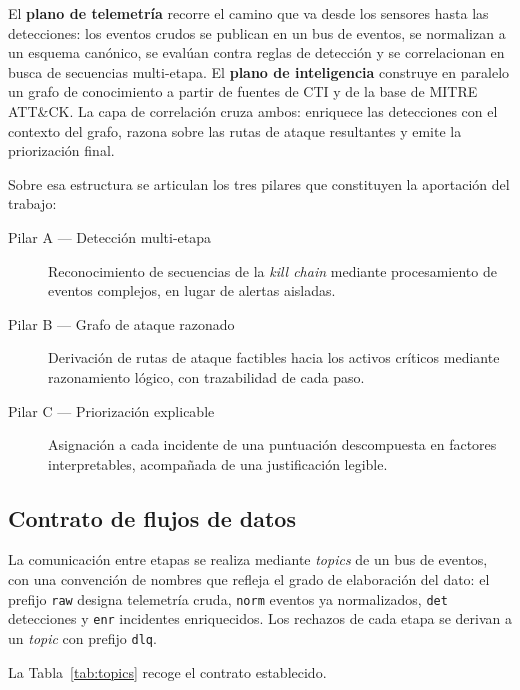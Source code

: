 El \textbf{plano de telemetría} recorre el camino que va desde los sensores hasta las
detecciones: los eventos crudos se publican en un bus de eventos, se normalizan a un esquema
canónico, se evalúan contra reglas de detección y se correlacionan en busca de secuencias
multi-etapa. El \textbf{plano de inteligencia} construye en paralelo un grafo de conocimiento
a partir de fuentes de CTI y de la base de MITRE ATT\&CK. La capa de correlación cruza ambos:
enriquece las detecciones con el contexto del grafo, razona sobre las rutas de ataque
resultantes y emite la priorización final.

Sobre esa estructura se articulan los tres pilares que constituyen la aportación del trabajo:

\begin{description}
    \item[Pilar A --- Detección multi-etapa] Reconocimiento de secuencias de la
    \textit{kill chain} mediante procesamiento de eventos complejos, en lugar de alertas
    aisladas.
    \item[Pilar B --- Grafo de ataque razonado] Derivación de rutas de ataque factibles hacia
    los activos críticos mediante razonamiento lógico, con trazabilidad de cada paso.
    \item[Pilar C --- Priorización explicable] Asignación a cada incidente de una puntuación
    descompuesta en factores interpretables, acompañada de una justificación legible.
\end{description}


\subsection{Contrato de flujos de datos}

La comunicación entre etapas se realiza mediante \textit{topics} de un bus de eventos, con
una convención de nombres que refleja el grado de elaboración del dato: el prefijo
\texttt{raw} designa telemetría cruda, \texttt{norm} eventos ya normalizados, \texttt{det}
detecciones y \texttt{enr} incidentes enriquecidos. Los rechazos de cada etapa se derivan a
un \textit{topic} con prefijo \texttt{dlq}.

La Tabla~\ref{tab:topics} recoge el contrato establecido.

